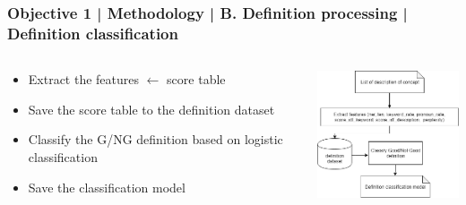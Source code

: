 \documentclass{beamer}
\begin{document}
\begin{frame}
\frametitle{Objective 1 | Methodology | B. Definition processing | Definition classification}
\begin{columns}

	\begin{column}{.55\textwidth}
		\begin{itemize}
			\item Extract the features $\leftarrow$ score table
			\item Save the score table to the definition dataset
			\item Classify the G/NG definition based on logistic classification
			\item Save the classification model
		\end{itemize}
	
	\end{column}
	\begin{column}{.55\textwidth}
	\includegraphics[width=50mm]{dc1.png}
\end{column}
	
	
\end{columns}
\end{frame}
\end{document}
